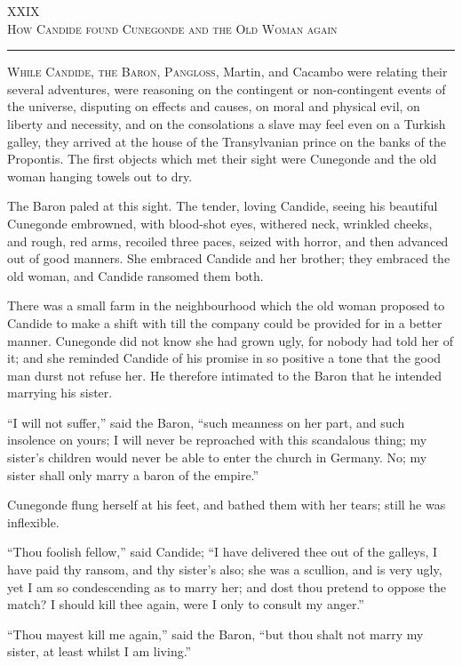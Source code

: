 \begin{center}
XXIX\\
\textsc{How Candide found Cunegonde and the Old Woman again}
\end{center}
\vspace{-0.5cm}
\rule{\textwidth}{0.5pt}
\lettrine{W}{hile Candide, the Baron, Pangloss}, Martin, and Cacambo were relating their several adventures, were reasoning on the contingent or non-contingent events of the universe, disputing on effects and causes, on moral and physical evil, on liberty and necessity, and on the consolations a slave may feel even on a Turkish galley, they arrived at the house of the Transylvanian prince on the banks of the Propontis. The first objects which met their sight were Cunegonde and the old woman hanging towels out to dry.

The Baron paled at this sight. The tender, loving Candide, seeing his beautiful Cunegonde embrowned, with blood-shot eyes, withered neck, wrinkled cheeks, and rough, red arms, recoiled three paces, seized with horror, and then advanced out of good manners. She embraced Candide and her brother; they embraced the old woman, and Candide ransomed them both.

There was a small farm in the neighbourhood which the old woman proposed to Candide to make a shift with till the company could be provided for in a better manner. Cunegonde did not know she had grown ugly, for nobody had told her of it; and she reminded Candide of his promise in so positive a tone that the good man durst not refuse her. He therefore intimated to the Baron that he intended marrying his sister.

``I will not suffer,'' said the Baron, ``such meanness on her part, and such insolence on yours; I will never be reproached with this scandalous thing; my sister's children would never be able to enter the church in Germany. No; my sister shall only marry a baron of the empire.''

Cunegonde flung herself at his feet, and bathed them with her tears; still he was inflexible.

``Thou foolish fellow,'' said Candide; ``I have delivered thee out of the galleys, I have paid thy ransom, and thy sister's also; she was a scullion, and is very ugly, yet I am so condescending as to marry her; and dost thou pretend to oppose the match? I should kill thee again, were I only to consult my anger.''

``Thou mayest kill me again,'' said the Baron, ``but thou shalt not marry my sister, at least whilst I am living.''

